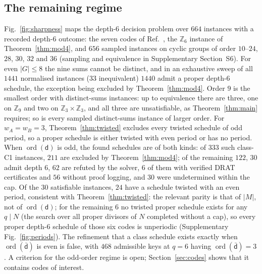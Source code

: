 \documentclass[reprint,twocolumn,superscriptaddress,nofootinbib]{revtex4-2}
\theoremstyle{plain}
\newcommand{\col}{\mathsf{d}}          %
\newcommand{\colbar}{\bar{\mathsf{d}}} %
\newcommand{\wA}{w_A}                  %
\newcommand{\wB}{w_B}
\begin{document}
\subsection{The remaining regime}
\label{sec:sharpness}

Fig.~\ref{fig:sharpness} maps the depth-$6$ decision problem over $664$
instances with a recorded depth-$6$ outcome: the seven codes of
Ref.~\cite{Bravyi2024}, the $\mathbb{Z}_6$ instance of
Theorem~\ref{thm:mod4}, and $656$ sampled instances on cyclic groups of
order $10$--$24$, $28$, $30$, $32$ and $36$ (sampling and equivalence in
Supplementary Section~S6). For even $|G|\le8$ the nine sums cannot be
distinct, and in an exhaustive sweep of all $1441$ normalised instances
($33$ inequivalent) $1440$ admit a proper depth-$6$ schedule, the
exception being excluded by Theorem~\ref{thm:mod4}. Order $9$ is the
smallest order with distinct-sums instances: up to equivalence there are
three, one on $\mathbb{Z}_9$ and two on $\mathbb{Z}_3\times\mathbb{Z}_3$,
and all three are unsatisfiable, as Theorem~\ref{thm:main} requires; so is
every sampled distinct-sums instance of larger order. For $\wA=\wB=3$,
Theorem~\ref{thm:twisted} excludes every twisted schedule of odd period, so
a proper schedule is either twisted with even period or has no period.
When $\operatorname{ord}(\col)$ is odd, the found schedules are of both
kinds: of $333$ such class-C1 instances, $211$ are excluded by
Theorem~\ref{thm:mod4}; of the remaining $122$, $30$ admit depth $6$, $62$
are refuted by the solver, $6$ of them with verified DRAT certificates and
$56$ without proof logging, and $30$ were undetermined within the cap. Of
the $30$ satisfiable instances, $24$ have a schedule twisted with an even
period, consistent with Theorem~\ref{thm:twisted}: the relevant parity is
that of $|M|$, not of $\operatorname{ord}(\col)$; for the remaining $6$ no
twisted proper schedule exists for any $q\mid N$ (the search over all
proper divisors of $N$ completed without a cap), so every proper depth-$6$
schedule of those six codes is unperiodic (Supplementary
Fig.~\ref{fig:periods}). The refinement that a class schedule exists
exactly when $\operatorname{ord}(\colbar)$ is even is false, with $468$
admissible keys at $q=6$ having $\operatorname{ord}(\colbar)=3$. A
criterion for the odd-order regime is open; Section~\ref{sec:codes} shows
that it contains codes of interest.
\end{document}
